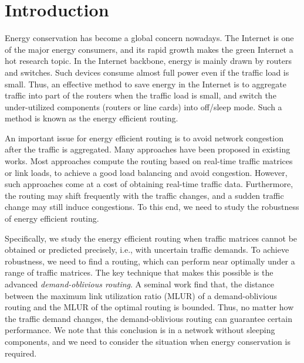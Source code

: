 \documentclass[conference]{IEEEtran}
\begin{document}
\IEEEpeerreviewmaketitle

\section{Introduction}
\label{introduction}

Energy conservation has become a global concern nowadays. The Internet is one of the major energy consumers, and its rapid growth makes the green Internet a hot research topic. In the Internet backbone, energy is mainly drawn by routers and switches. Such devices consume almost full power even if the traffic load is small. Thus, an effective method to save energy in the Internet is to aggregate traffic into part of the routers when the traffic load is small, and switch the under-utilized components (routers or line cards) into off/sleep mode. Such a method is known as the energy efficient routing.

An important issue for energy efficient routing is to avoid network congestion after the traffic is aggregated. Many approaches have been proposed in existing works. Most approaches compute the routing based on real-time traffic matrices or link loads, to achieve a good load balancing and avoid congestion. However, such approaches come at a cost of obtaining real-time traffic data. Furthermore, the routing may shift frequently with the traffic changes, and a sudden traffic change may still induce congestions. To this end, we need to study the robustness of energy efficient routing.

Specifically, we study the energy efficient routing when traffic matrices cannot be obtained or predicted precisely, i.e., with uncertain traffic demands. To achieve robustness, we need to find a routing, which can perform near optimally under a range of traffic matrices. The key technique that makes this possible is the advanced \emph{demand-oblivious routing}. A seminal work \cite{networking:oblivious} find that, the distance between the maximum link utilization ratio (MLUR) of a demand-oblivious routing and the MLUR of the optimal routing is bounded. Thus, no matter how the traffic demand changes, the demand-oblivious routing can guarantee certain performance. We note that this conclusion is in a network without sleeping components, and we need to consider the situation when energy conservation is required.
\end{document}
